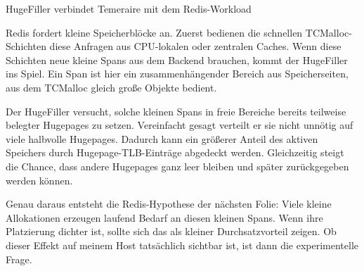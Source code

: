 \documentclass[aspectratio=169,10pt]{beamer}
\begin{document}
\begin{frame}{HugeFiller verbindet Temeraire mit dem Redis-Workload}
{  \par\medskip
  Redis fordert kleine Speicherbl\"ocke an. Zuerst bedienen die schnellen TCMalloc-Schichten diese Anfragen aus CPU-lokalen oder zentralen Caches. Wenn diese Schichten neue kleine Spans aus dem Backend brauchen, kommt der HugeFiller ins Spiel. Ein Span ist hier ein zusammenh\"angender Bereich aus Speicherseiten, aus dem TCMalloc gleich gro\ss e Objekte bedient.

  \par\medskip
  Der HugeFiller versucht, solche kleinen Spans in freie Bereiche bereits teilweise belegter Hugepages zu setzen. Vereinfacht gesagt verteilt er sie nicht unn\"otig auf viele halbvolle Hugepages. Dadurch kann ein gr\"o\ss erer Anteil des aktiven Speichers durch Hugepage-TLB-Eintr\"age abgedeckt werden. Gleichzeitig steigt die Chance, dass andere Hugepages ganz leer bleiben und sp\"ater zur\"uckgegeben werden k\"onnen.

  \par\medskip
  Genau daraus entsteht die Redis-Hypothese der n\"achsten Folie: Viele kleine Allokationen erzeugen laufend Bedarf an diesen kleinen Spans. Wenn ihre Platzierung dichter ist, sollte sich das als kleiner Durchsatzvorteil zeigen. Ob dieser Effekt auf meinem Host tats\"achlich sichtbar ist, ist dann die experimentelle Frage.
}
\end{frame}
\end{document}
